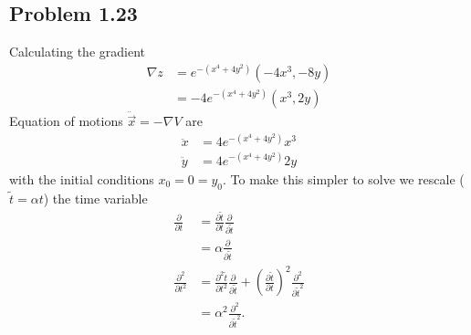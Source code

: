 \documentclass[../main.tex]{subfiles}
\begin{document}
\subsection{Problem 1.23}
Calculating the gradient
\begin{align}
\nabla z&=e^{-(x^4+4y^2)}(-4x^3,-8y)\\
&=-4e^{-(x^4+4y^2)}(x^3,2y)
\end{align}
Equation of motions $\ddot{\vec{x}}=-\nabla V$ are
\begin{align}
\ddot x&=4e^{-(x^4+4y^2)}x^3\\
\ddot y&=4e^{-(x^4+4y^2)}2y
\end{align}
with the initial conditions $x_0=0=y_0$. To make this simpler to solve we rescale ($\tilde t=\alpha t$) the time variable
\begin{align}
\frac{\partial}{\partial t}
&=\frac{\partial\tilde{t}}{\partial t}\frac{\partial}{\partial \tilde{t}}\\
&=\alpha\frac{\partial}{\partial \tilde{t}}\\
\frac{\partial^2}{\partial t^2}
&=\frac{\partial^2\tilde{t}}{\partial t^2}\frac{\partial}{\partial \tilde{t}}+\left(\frac{\partial\tilde{t}}{\partial t}\right)^2\frac{\partial^2}{\partial {\tilde t}^2}\\
&=\alpha^2\frac{\partial^2}{\partial {\tilde t}^2}.
\end{align}
\end{document}
